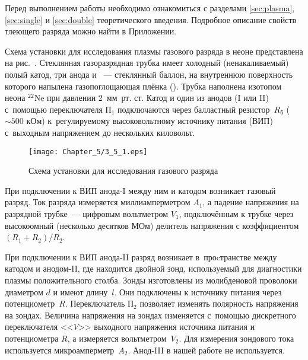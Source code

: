 



Перед выполнением работы необходимо ознакомиться с разделами
\ref{sec:plasma}, \ref{sec:single} и \ref{sec:double} теоретического введения.
Подробное описание свойств тлеющего разряда можно найти в Приложении.

Схема установки для исследования плазмы газового разряда в неоне представлена на
рис.~. Стеклянная газоразрядная
трубка имеет холодный (ненакаливаемый) полый катод, три анода и
~--- стеклянный баллон, на
внутреннюю поверхность которого напылена газопоглощающая плёнка
(). Трубка наполнена изотопом неона
$^{22}$Ne при давлении 2~мм~рт. ст. Катод и один из анодов (I или II) с~помощью
переключателя $\text{П}_1$ подключаются через
балластный резистор~$R_\text{б}$ ($\sim500$ кОм) к~регулируемому высоковольтному
источнику питания (ВИП) с~выходным
напряжением до нескольких киловольт.

\begin{figure}[h!]
    \centering
	\texttt{[image: Chapter\_5/3\_5\_1.eps]}
	\caption{Схема установки для исследования газового разряда}
\end{figure}

При подключении к ВИП анода-I между ним и катодом возникает газовый разряд. Ток
разряда измеряется миллиамперметром
$A_1$, а падение напряжения на разрядной трубке~--- цифровым вольтметром
$V_{1}$, подключённым к трубке через
высокоомный (несколько десятков МОм) делитель напряжения с коэффициентом
$(R_1+R_2)/R_2$.

При подключении к ВИП анода-II разряд возникает в~проcтранстве между катодом и
анодом-II, где находится двойной зонд,
используемый для диагностики плазмы положительного столба. Зонды изготовлены из
молибденовой проволоки диаметром
$d$ и имеют длину~$l$. Они подключены к источнику питания через
потенциометр~$R$. Переключатель
$\text{П}_2$ позволяет изменять полярность напряжения на зондах. Величина
напряжения на зондах изменяется с~помощью дискретного
переключателя <<$V$>> выходного напряжения источника питания и потенциометра
$R$, а измеряется вольтметром~$V_2$. Для
измерения зондового тока используется микроамперметр~$A_2$.
Анод-III в нашей работе не используется.


